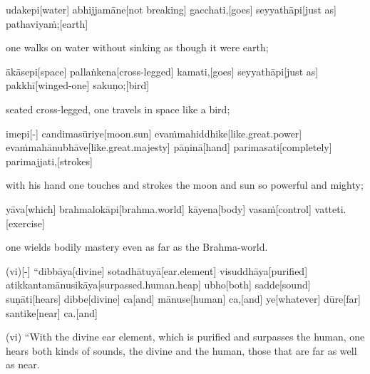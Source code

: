 \begin{samepage}
\begingl[glneveryline={\PaliGlossA,\PaliGlossB}]
udakepi[water] abhijjamāne[not breaking] gacchati,[goes] seyyathāpi[just as] pathaviyaṁ;[earth]
\endgl
\nopagebreak
\linespread{0.5}
\begin{spacin}{0.2}
{\PaliGlossFT one walks on water without sinking as though it were earth;}
\end{spacin}
\vskip 12pt
\end{samepage}
\begin{samepage}
\begingl[glneveryline={\PaliGlossA,\PaliGlossB}]
ākāsepi[space] pallaṅkena[cross-legged] kamati,[goes] seyyathāpi[just as] pakkhī[winged-one] sakuṇo;[bird]
\endgl
\nopagebreak
\linespread{0.5}
\begin{spacin}{0.2}
{\PaliGlossFT seated cross-legged, one travels in space like a bird;}
\end{spacin}
\vskip 12pt
\end{samepage}
\begin{samepage}
\begingl[glneveryline={\PaliGlossA,\PaliGlossB}]
imepi[-] candimasūriye[moon.sun] evaṁmahiddhike[like.great.power] evaṁmahānubhāve[like.great.majesty] pāṇinā[hand] parimasati[completely] parimajjati,[strokes]
\endgl
\nopagebreak
\linespread{0.5}
\begin{spacin}{0.2}
{\PaliGlossFT with his hand one touches and strokes the moon and sun so powerful and mighty;}
\end{spacin}
\vskip 12pt
\end{samepage}
\begin{samepage}
\begingl[glneveryline={\PaliGlossA,\PaliGlossB}]
yāva[which] brahmalokāpi[brahma.world] kāyena[body] vasaṁ[control] vatteti.[exercise]
\endgl
\nopagebreak
\linespread{0.5}
\begin{spacin}{0.2}
{\PaliGlossFT one wields bodily mastery even as far as the Brahma-world.}
\end{spacin}
\vskip 12pt
\end{samepage}
\begin{samepage}
\begingl[glneveryline={\PaliGlossA,\PaliGlossB}]
(vi)[-] “dibbāya[divine] sotadhātuyā[ear.element] visuddhāya[purified] atikkantamānusikāya[surpassed.human.heap] ubho[both] sadde[sound] suṇāti[hears] dibbe[divine] ca[and] mānuse[human] ca,[and] ye[whatever] dūre[far] santike[near] ca.[and]
\endgl
\nopagebreak
\linespread{0.5}
\begin{spacin}{0.2}
{\PaliGlossFT (vi) “With the divine ear element, which is purified and surpasses the human, one hears both kinds of sounds, the divine and the human, those that are far as well as near.}
\end{spacin}
\vskip 12pt
\end{samepage}

